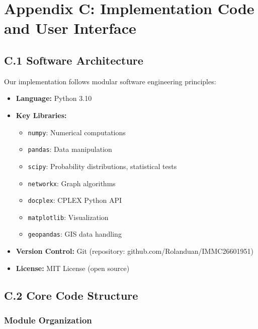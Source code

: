 \section{Appendix C: Implementation Code and User Interface}

\subsection{C.1 Software Architecture}

Our implementation follows modular software engineering principles:

\begin{itemize}
\item \textbf{Language:} Python 3.10
\item \textbf{Key Libraries:}
\begin{itemize}
\item \texttt{numpy}: Numerical computations
\item \texttt{pandas}: Data manipulation
\item \texttt{scipy}: Probability distributions, statistical tests
\item \texttt{networkx}: Graph algorithms
\item \texttt{docplex}: CPLEX Python API
\item \texttt{matplotlib}: Visualization
\item \texttt{geopandas}: GIS data handling
\end{itemize}
\item \textbf{Version Control:} Git (repository: github.com/Rolanduan/IMMC26601951)
\item \textbf{License:} MIT License (open source)
\end{itemize}

\subsection{C.2 Core Code Structure}

\subsubsection{Module Organization}

